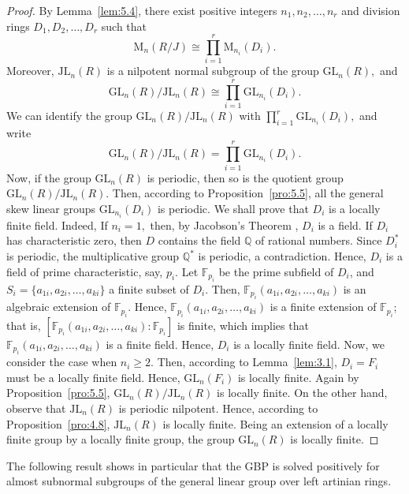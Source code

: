 \documentclass{amsart}
\theoremstyle{definition}
\begin{document}
\begin{proof} By Lemma~\ref{lem:5.4}, there exist positive integers $n_1, n_2,\ldots, n_r$ and division rings $D_1, D_2,\ldots, D_r$ such that $$\mathrm{M}_n(R/J)\cong \prod_{i=1}^{r}\mathrm{M}_{n_i}(D_i).$$
Moreover, $\mathrm{JL}_n(R)$ is a nilpotent normal subgroup of the group $\mathrm{GL}_n(R),$ and $$\mathrm{GL}_n(R)/\mathrm{JL}_n(R)\cong \prod_{i=1}^{r}\mathrm{GL}_{n_i}(D_i).$$ We can identify the group $\mathrm{GL}_n(R)/\mathrm{JL}_n(R)$ with $\prod_{i=1}^{r}\mathrm{GL}_{n_i}(D_i),$ and write $$\mathrm{GL}_n(R)/\mathrm{JL}_n(R)=\prod_{i=1}^{r}\mathrm{GL}_{n_i}(D_i).$$
Now, if the group $\mathrm{GL}_n(R)$ is periodic, then so is the quotient group $\mathrm{GL}_n(R)/\mathrm{JL}_n(R).$ Then, according to Proposition~\ref{pro:5.5}, all the general skew linear groups $\mathrm{GL}_{n_i}(D_i)$ is periodic. We shall prove that $D_i$ is a locally finite field. Indeed, If $n_i=1,$ then, by Jacobson's Theorem \cite[Theorem 3.9.5]{Bo_Cohn_1995}, $D_i$ is a field. If $D_i$ has characteristic zero, then $D$ contains the field $\mathbb{Q}$ of rational numbers. Since $D_i^*$ is periodic, the multiplicative group $\mathbb{Q}^*$ is periodic, a contradiction. Hence, $D_i$ is a field of prime characteristic, say, $p_i.$ Let $\mathbb{F}_{p_i}$ be the prime subfield of $D_i$, and $S_i=\{a_{1i},a_{2i},\ldots,a_{ki}\}$ a finite subset of $D_i.$ Then, $\mathbb{F}_{p_i}(a_{1i},a_{2i},\ldots,a_{ki})$ is an algebraic extension of $\mathbb{F}_{p_i}.$ Hence, $\mathbb{F}_{p_i}(a_{1i},a_{2i},\ldots,a_{ki})$ is a finite extension of $\mathbb{F}_{p_i}$; that is, $[\mathbb{F}_{p_i}(a_{1i},a_{2i},\ldots,a_{ki}):\mathbb{F}_{p_i}]$ is finite, which  implies that $\mathbb{F}_{p_i}(a_{1i},a_{2i},\ldots,a_{ki})$ is a finite field. Hence, $D_i$ is a locally finite field. Now, we consider the case when $n_i\geq 2.$ Then, according to Lemma~\ref{lem:3.1}, $D_i=F_i$ must be a locally finite field. Hence, $\mathrm{GL}_n(F_i)$ is locally finite. Again by Proposition~\ref{pro:5.5}, $\mathrm{GL}_n(R)/\mathrm{JL}_n(R)$ is locally finite. On the other hand, observe that $\mathrm{JL}_n(R)$ is periodic nilpotent. Hence, according to Proposition~\ref{pro:4.8}, $\mathrm{JL}_n(R)$ is locally finite. Being an extension of a locally finite group by a locally finite group, the group $\mathrm{GL}_n(R)$ is locally finite. 
\end{proof}
The following result shows in particular that the GBP is solved positively for almost subnormal subgroups of the general linear group over left artinian rings.
\end{document}
